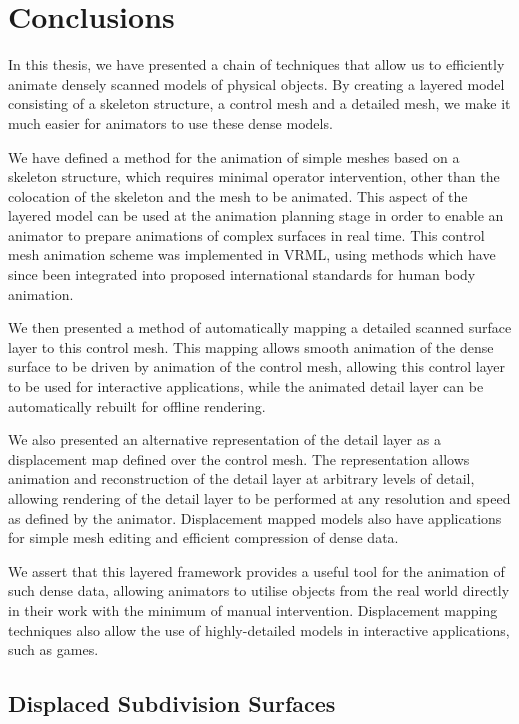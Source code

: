 \chapter{\label{sec:conclusion} Conclusions}

In this thesis, we have presented a chain of techniques that allow us to efficiently animate densely scanned models of physical objects. By creating a layered model consisting of a skeleton structure, a control mesh and a detailed mesh, we make it much easier for animators to use these dense models. 

We have defined a method for the animation of simple meshes based on a skeleton structure, which requires minimal operator intervention, other than the colocation of the skeleton and the mesh to be animated. This aspect of the layered model can be used at the animation planning stage in order to enable an animator to prepare animations of complex surfaces in real time. This control mesh animation scheme was implemented in VRML, using methods which have since been integrated into proposed international standards for human body animation.

We then presented a method of automatically mapping a detailed scanned surface layer to this control mesh. This mapping allows smooth animation of the dense surface to be driven by animation of the control mesh, allowing this control layer to be used for interactive applications, while the animated detail layer can be automatically rebuilt for offline rendering.

We also presented an alternative representation of the detail layer as a displacement map defined over the control mesh. The representation allows animation and reconstruction of the detail layer at arbitrary levels of detail, allowing rendering of the detail layer to be performed at any resolution and speed as defined by the animator. Displacement mapped models also have applications for simple mesh editing and efficient compression of dense data.

We assert that this layered framework provides a useful tool for the animation of such dense data, allowing animators to utilise objects from the real world directly in their work with the minimum of manual intervention. Displacement mapping techniques also allow the use of highly-detailed models in interactive applications, such as games.

\section{\label{sec:conclusion:dispsubdiv}Displaced Subdivision Surfaces}

